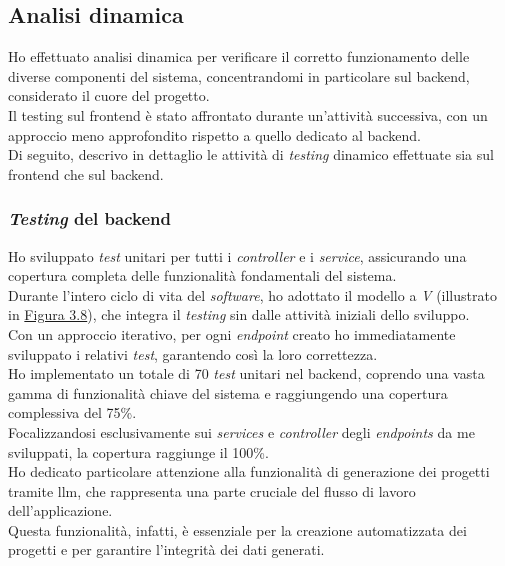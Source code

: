 \subsection{Analisi dinamica}
\label{subsec:analisi-dinamica}


Ho effettuato analisi dinamica per verificare il corretto funzionamento delle diverse componenti del sistema, concentrandomi in particolare sul \gls{backend}, considerato il cuore del progetto. \\
Il testing sul \gls{frontend} è stato affrontato durante un'attività successiva, con un approccio meno approfondito rispetto a quello dedicato al \gls{backend}.\\

\noindent Di seguito, descrivo in dettaglio le attività di \textit{testing} dinamico effettuate sia sul \gls{frontend} che sul \gls{backend}.
\pagebreak
\subsubsection{\textit{Testing} del \gls{backend}}

Ho sviluppato \textit{test} unitari per tutti i \textit{controller} e i \textit{service}, assicurando una copertura completa delle funzionalità fondamentali del sistema.\\

\noindent Durante l'intero ciclo di vita del \textit{software}, ho adottato il modello a \textit{V} (illustrato in {\hyperref[fig:v-model]{Figura 3.8}}), che integra il \textit{testing} sin dalle attività iniziali dello sviluppo. \\
Con un approccio iterativo, per ogni \textit{endpoint} creato ho immediatamente sviluppato i relativi \textit{test}, garantendo così la loro correttezza.\\

\noindent Ho implementato un totale di 70 \textit{test} unitari nel \gls{backend}, coprendo una vasta gamma di funzionalità chiave del sistema e raggiungendo una copertura complessiva del 75\%.\\
Focalizzandosi esclusivamente sui \textit{services} e \textit{controller} degli \textit{endpoints} da me sviluppati, la copertura raggiunge il 100\%.\\
Ho dedicato particolare attenzione alla funzionalità di generazione dei progetti tramite \gls{llm}, che rappresenta una parte cruciale del flusso di lavoro dell'applicazione.\\
 Questa funzionalità, infatti, è essenziale per la creazione automatizzata dei progetti e per garantire l'integrità dei dati generati.\\


